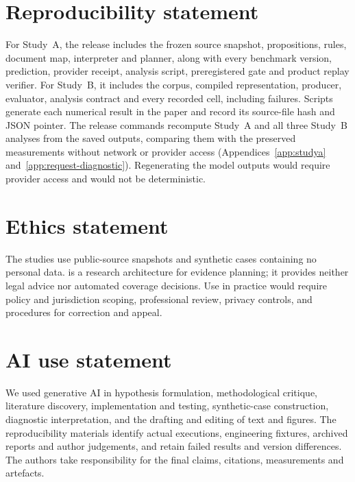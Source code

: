 \section*{Reproducibility statement}
For Study~A, the release includes the frozen source snapshot, propositions,
rules, document map, interpreter and planner, along with every benchmark
version, prediction, provider receipt, analysis script, preregistered gate
and product replay verifier. For Study~B, it includes the corpus, compiled
representation, producer, evaluator, analysis contract and every recorded
cell, including failures. Scripts generate each numerical result in the
paper and record its source-file hash and JSON pointer. The release
commands recompute Study~A and all three Study~B analyses from the saved
outputs, comparing them with the preserved measurements without network or
provider access (Appendices~\ref{app:studya} and~\ref{app:request-diagnostic}).
Regenerating the model outputs would require provider access and would not
be deterministic.

\section*{Ethics statement}
The studies use public-source snapshots and synthetic cases containing no
personal data. \casepath is a research architecture for evidence planning;
it provides neither legal advice nor automated coverage decisions. Use in
practice would require policy and jurisdiction scoping, professional review,
privacy controls, and procedures for correction and appeal.

\section*{AI use statement}
We used generative AI in hypothesis formulation, methodological critique,
literature discovery, implementation and testing, synthetic-case construction,
diagnostic interpretation, and the drafting and editing of text and figures.
The reproducibility materials identify actual executions, engineering
fixtures, archived reports and author judgements, and retain failed results
and version differences. The authors take responsibility for the final
claims, citations, measurements and artefacts.
